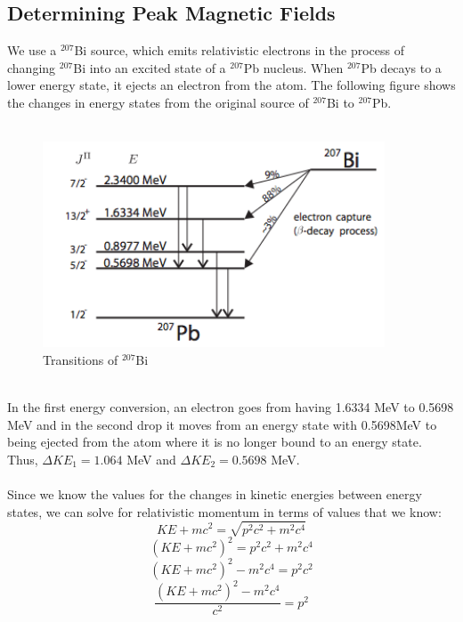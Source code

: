 \subsection{Determining Peak Magnetic Fields}
We use a $^{207}$Bi source, which emits relativistic electrons in the process of changing $^{207}$Bi into an excited state of a $^{207}$Pb nucleus. When $^{207}$Pb decays to a lower energy state, it ejects an electron from the atom. The following figure shows the changes in energy states from the original source of $^{207}$Bi to $^{207}$Pb. \\
\\
\begin{figure}[h]
\begin{center}
\includegraphics[width=4in]{energylevels.png}
\caption{Transitions of $^{207}$Bi}
\end{center}
\end{figure}\\
In the first energy conversion, an electron goes from having 1.6334 MeV to 0.5698 MeV and in the second drop it moves from an energy state with 0.5698MeV to being ejected from the atom where it is no longer bound to an energy state. Thus, $\Delta KE_1=1.064$ MeV and $\Delta KE_2= 0.5698$ MeV. \\
\\
Since we know the values for the changes in kinetic energies between energy states, we can solve for relativistic momentum in terms of values that we know:
\begin{equation}KE+mc^2=\sqrt{p^2c^2+m^2c^4}\end{equation}
\begin{equation}(KE+mc^2)^2=p^2c^2+m^2c^4\end{equation}
\begin{equation}(KE+mc^2)^2-m^2c^4=p^2c^2\end{equation}
\begin{equation}\frac{(KE+mc^2)^2-m^2c^4}{c^2}=p^2\end{equation}
